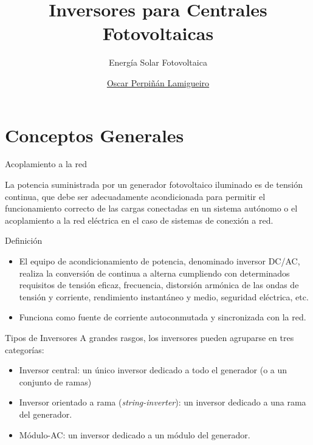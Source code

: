 \documentclass[aspectratio=169, usenames,svgnames,dvipsnames]{beamer}
\author{\href{https://oscarperpinan.github.io}{Oscar Perpiñán Lamigueiro}}
\date{}
\title{Inversores para Centrales Fotovoltaicas}
\subtitle{Energía Solar Fotovoltaica}
\institute[UPM]{Universidad Politécnica de Madrid}
\begin{document}
\maketitle


\section{Conceptos Generales}
\label{sec:org8712ec6}
\begin{frame}[label={sec:orgbe2d917}]{Acoplamiento a la red}
\begin{block}{}
La potencia suministrada por un generador fotovoltaico iluminado es de
tensión continua, que debe ser adecuadamente acondicionada para permitir
el funcionamiento correcto de las cargas conectadas en un sistema
autónomo o el acoplamiento a la red eléctrica en el caso de sistemas de
conexión a red.
\end{block}
\end{frame}

\begin{frame}[label={sec:org5f9ade9}]{Definición}
\begin{itemize}
\item El equipo de acondicionamiento de potencia, denominado inversor DC/AC, realiza la \alert{conversión de continua a alterna cumpliendo con  determinados requisitos} de tensión eficaz, frecuencia, distorsión armónica de las ondas de tensión y corriente, rendimiento instantáneo y medio, seguridad eléctrica, etc.

\item Funciona como fuente de corriente autoconmutada y sincronizada con la red.
\end{itemize}
\end{frame}

\begin{frame}[label={sec:org22b456a}]{Tipos de Inversores}
A grandes rasgos, los inversores pueden agruparse en tres categorías:

\begin{itemize}
\item \alert{Inversor central}: un único inversor dedicado a todo el generador (o
a un conjunto de ramas)

\item \alert{Inversor orientado a rama} (\emph{string-inverter}): un inversor dedicado
a una rama del generador.

\item \alert{Módulo-AC}: un inversor dedicado a un módulo del generador.
\end{itemize}
\end{frame}
\end{document}
